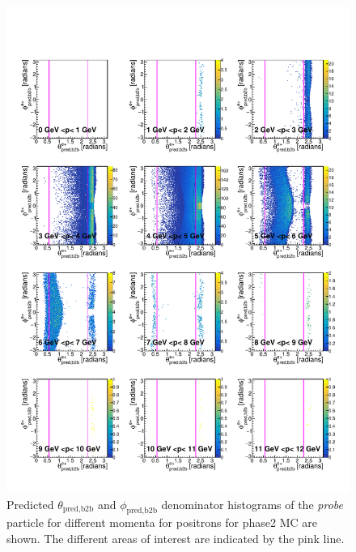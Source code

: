 \documentclass[a4paper,11pt,twosided,final,german,openbib,pdftex,listof=totoc,bibliography=totoc]{scrbook}
\begin{document}
\begin{appendix}
\begin{figure}[h!]
	\includegraphics[width=\textwidth]{Plots/master/RTPMepE_MC.pdf}
	\caption[Enumerator $\theta_{\textrm{pred,b2b}}$-$\phi_{\textrm{pred,b2b}}$ Positron Momentum Phase2 MC]{Predicted $\theta_{\textrm{pred,b2b}}$ and $\phi_{\textrm{pred,b2b}}$ denominator histograms of the \textit{probe} particle for different momenta for positrons for phase2 MC are shown. The different areas of interest are indicated by the pink line.}
	\label{plt:RTPMepE_MC}
\end{figure}



\end{appendix}
\end{document}
